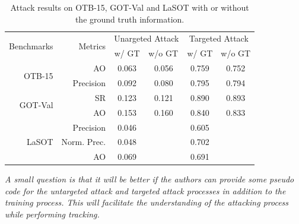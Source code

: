 \documentclass[12pt]{article}
\begin{document}
\begin{table}[t]
  \centering
  \caption{Attack results on OTB-15, GOT-Val and LaSOT with or without the ground truth information.}
  \begin{tabular}{rrcccc}
  \toprule
  \multirow{2}{*}{Benchmarks} & \multirow{2}{*}{Metrics} & \multicolumn{2}{c}{Unargeted Attack} & \multicolumn{2}{c}{Targeted Attack} \\ \cmidrule{3-6}
                              &                          & w/ GT  & \multicolumn{1}{l}{w/o GT}  & w/ GT  & \multicolumn{1}{l}{w/o GT} \\ \midrule
  \multirow{2}{*}{OTB-15}     & AO                       & 0.063  & 0.056                       & 0.759  & 0.752                      \\
                              & Precision                & 0.092  & 0.080                       & 0.795  & 0.794                      \\ \midrule
  \multirow{2}{*}{GOT-Val}    & SR                       & 0.123  & 0.121                       & 0.890  & 0.893                      \\
                              & AO                       & 0.153  & 0.160                       & 0.840  & 0.833                      \\ \midrule
  \multirow{3}{*}{LaSOT}      & Precision                & 0.046  &                             & 0.605  &                            \\
                              & Norm. Prec.              & 0.048  &                             & 0.702  &                            \\
                              & AO                       & 0.069  &                             & 0.691  &                            \\ \bottomrule
  \end{tabular}
  \label{tab:agent_GT}
\end{table}

\textit{A small question is that it will be better if the authors can provide some pseudo code for the untargeted attack and targeted attack processes in addition to the training process. This will facilitate the understanding of the attacking process while performing tracking.}
\end{document}
